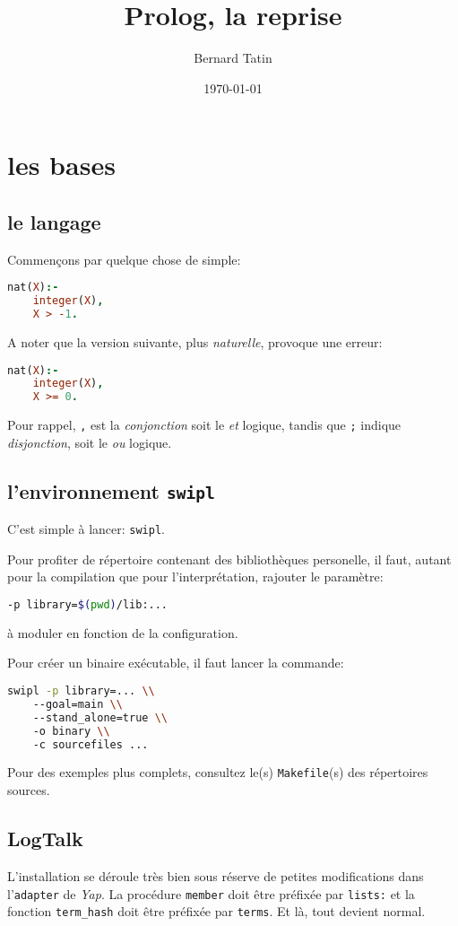 \documentclass[a4paper,12pt]{book}
\title{Prolog, la reprise}
\author{Bernard Tatin}
\date{\today}
\begin{document}
\maketitle
\tableofcontents

\chapter{les bases}

\section{le langage}
Commençons par quelque chose de simple:

\begin{lstlisting}[language=Prolog]
nat(X):-
	integer(X),
	X > -1.
\end{lstlisting}

A noter que la version suivante, plus \emph{naturelle}, provoque une erreur:

\begin{lstlisting}[language=Prolog]
nat(X):-
	integer(X),
	X >= 0.
\end{lstlisting}

Pour rappel, \texttt{,} est la \textit{conjonction} soit le \textit{et} logique, tandis que \texttt{;} indique \textit{disjonction}, soit le \textit{ou} logique.

\section{l'environnement \texttt{swipl}}

C'est simple à lancer: \texttt{swipl}. 

Pour profiter de répertoire contenant des bibliothèques personelle, il faut, autant pour la compilation que pour l'interprétation, rajouter le paramètre:
\begin{lstlisting}[language=sh] 
-p library=$(pwd)/lib:...
\end{lstlisting}
 
à moduler en fonction de la configuration.

Pour créer un binaire exécutable, il faut lancer la commande:
\begin{lstlisting}[language=sh]
swipl -p library=... \\
    --goal=main \\
    --stand_alone=true \\
    -o binary \\
    -c sourcefiles ...
\end{lstlisting}

Pour des exemples plus complets, consultez le(s) \texttt{Makefile}(s) des répertoires sources.

\section{LogTalk}
L'installation se déroule très bien sous réserve de petites modifications dans l'\texttt{adapter} de \emph{Yap}. La procédure \texttt{member} doit être préfixée par \texttt{lists:} et la fonction \texttt{term\_hash} doit être préfixée par \texttt{terms}. Et là, tout devient normal.
\end{document}
